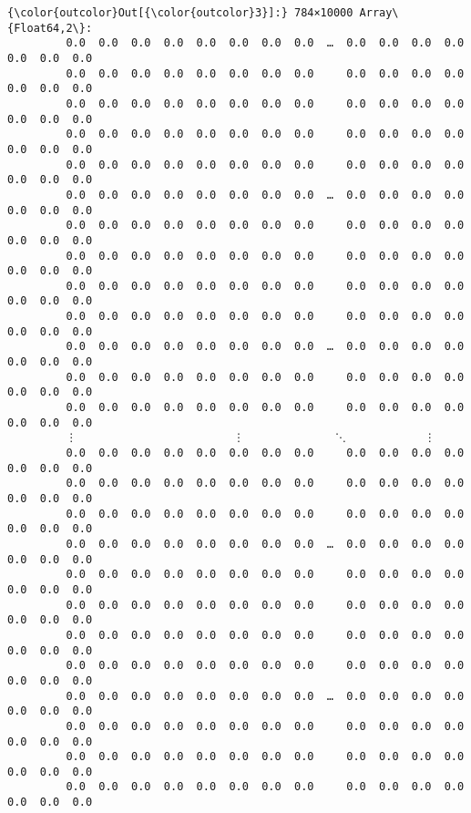 \documentclass[11pt]{article}
\begin{document}
\begin{Verbatim}[commandchars=\\\{\}]
{\color{outcolor}Out[{\color{outcolor}3}]:} 784×10000 Array\{Float64,2\}:
         0.0  0.0  0.0  0.0  0.0  0.0  0.0  0.0  …  0.0  0.0  0.0  0.0  0.0  0.0  0.0
         0.0  0.0  0.0  0.0  0.0  0.0  0.0  0.0     0.0  0.0  0.0  0.0  0.0  0.0  0.0
         0.0  0.0  0.0  0.0  0.0  0.0  0.0  0.0     0.0  0.0  0.0  0.0  0.0  0.0  0.0
         0.0  0.0  0.0  0.0  0.0  0.0  0.0  0.0     0.0  0.0  0.0  0.0  0.0  0.0  0.0
         0.0  0.0  0.0  0.0  0.0  0.0  0.0  0.0     0.0  0.0  0.0  0.0  0.0  0.0  0.0
         0.0  0.0  0.0  0.0  0.0  0.0  0.0  0.0  …  0.0  0.0  0.0  0.0  0.0  0.0  0.0
         0.0  0.0  0.0  0.0  0.0  0.0  0.0  0.0     0.0  0.0  0.0  0.0  0.0  0.0  0.0
         0.0  0.0  0.0  0.0  0.0  0.0  0.0  0.0     0.0  0.0  0.0  0.0  0.0  0.0  0.0
         0.0  0.0  0.0  0.0  0.0  0.0  0.0  0.0     0.0  0.0  0.0  0.0  0.0  0.0  0.0
         0.0  0.0  0.0  0.0  0.0  0.0  0.0  0.0     0.0  0.0  0.0  0.0  0.0  0.0  0.0
         0.0  0.0  0.0  0.0  0.0  0.0  0.0  0.0  …  0.0  0.0  0.0  0.0  0.0  0.0  0.0
         0.0  0.0  0.0  0.0  0.0  0.0  0.0  0.0     0.0  0.0  0.0  0.0  0.0  0.0  0.0
         0.0  0.0  0.0  0.0  0.0  0.0  0.0  0.0     0.0  0.0  0.0  0.0  0.0  0.0  0.0
         ⋮                        ⋮              ⋱            ⋮                      
         0.0  0.0  0.0  0.0  0.0  0.0  0.0  0.0     0.0  0.0  0.0  0.0  0.0  0.0  0.0
         0.0  0.0  0.0  0.0  0.0  0.0  0.0  0.0     0.0  0.0  0.0  0.0  0.0  0.0  0.0
         0.0  0.0  0.0  0.0  0.0  0.0  0.0  0.0     0.0  0.0  0.0  0.0  0.0  0.0  0.0
         0.0  0.0  0.0  0.0  0.0  0.0  0.0  0.0  …  0.0  0.0  0.0  0.0  0.0  0.0  0.0
         0.0  0.0  0.0  0.0  0.0  0.0  0.0  0.0     0.0  0.0  0.0  0.0  0.0  0.0  0.0
         0.0  0.0  0.0  0.0  0.0  0.0  0.0  0.0     0.0  0.0  0.0  0.0  0.0  0.0  0.0
         0.0  0.0  0.0  0.0  0.0  0.0  0.0  0.0     0.0  0.0  0.0  0.0  0.0  0.0  0.0
         0.0  0.0  0.0  0.0  0.0  0.0  0.0  0.0     0.0  0.0  0.0  0.0  0.0  0.0  0.0
         0.0  0.0  0.0  0.0  0.0  0.0  0.0  0.0  …  0.0  0.0  0.0  0.0  0.0  0.0  0.0
         0.0  0.0  0.0  0.0  0.0  0.0  0.0  0.0     0.0  0.0  0.0  0.0  0.0  0.0  0.0
         0.0  0.0  0.0  0.0  0.0  0.0  0.0  0.0     0.0  0.0  0.0  0.0  0.0  0.0  0.0
         0.0  0.0  0.0  0.0  0.0  0.0  0.0  0.0     0.0  0.0  0.0  0.0  0.0  0.0  0.0
\end{Verbatim}
            
\end{document}
